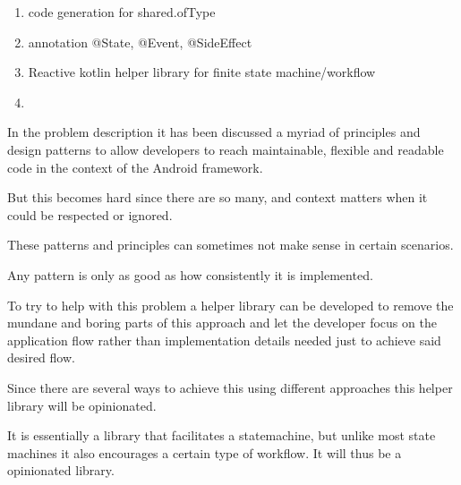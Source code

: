\begin{enumerate}

    \item code generation for shared.ofType
    \item annotation @State, @Event, @SideEffect
    \item Reactive kotlin helper library for finite state machine/workflow
    \item 

\end{enumerate}

In the problem description it has been discussed a myriad of principles and design patterns
to allow developers to reach maintainable, flexible and readable code in the context of the Android framework.

But this becomes hard since there are so many, and context matters when it could be respected or ignored.

These patterns and principles can sometimes not make sense in certain scenarios.

Any pattern is only as good as how consistently it is implemented. 

To try to help with this problem a helper library can be developed to remove the mundane
and boring parts of this approach and let the developer focus on the application flow rather
than implementation details needed just to achieve said desired flow.

Since there are several ways to achieve this using different approaches this helper
library will be opinionated.

It is essentially a library that facilitates a statemachine, but unlike most
state machines it also encourages a certain type of workflow. It will thus be a opinionated
library.